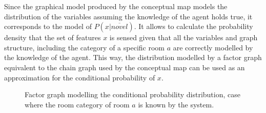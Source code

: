 Since the graphical model produced by the conceptual map models the distribution of
the variables assuming the knowledge of the agent holds true, it corresponds to the model of
$P(x|\overline{novel})$. It allows to calculate the probability density that the set of features $x$ is
sensed given that all the variables and graph structure, including the category of
a specific room $a$ are correctly modelled by the knowledge of the agent.
This way, the distribution modelled by a factor graph equivalent to the chain graph used by
the conceptual map can be used as an approximation for the conditional probability of $x$.

\begin{figure}[h]
\centering
{}

\caption{Factor graph modelling the conditional probability distribution, case where the
         room category of room $a$ is known by the system.}
\end{figure}


